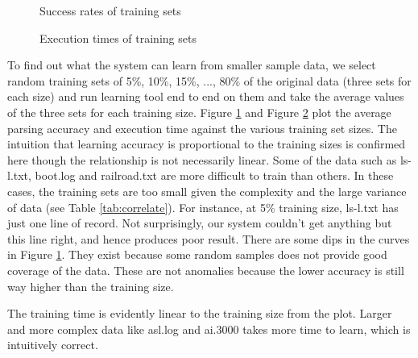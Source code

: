 \begin{figure}
\caption{Success rates of training sets} \label{fig:trainsucc}
\end{figure}

\begin{figure}
\caption{Execution times of training sets} \label{fig:traintime}
\end{figure}

To find out what the system can learn from smaller sample data,
we select random training sets of 5\%, 10\%, 15\%, ..., 80\% of 
the original data (three sets for each size) and run learning tool end to end on 
them and take the average values of the three sets for each training size. 
Figure \ref{fig:trainsucc} and Figure \ref{fig:traintime} plot the average 
parsing accuracy and execution time against the various training set sizes.
The intuition that learning accuracy is proportional to the training sizes is
confirmed here though the relationship is not necessarily linear. Some of the
data such as ls-l.txt, boot.log and railroad.txt are more difficult to train
than others. In these cases, the training sets are too small 
given the complexity and the large variance of data (see Table \ref{tab:correlate}).
For instance, at 5\% training size, ls-l.txt has just one line of record. 
Not surprisingly, our system couldn't get anything but this line right, and
hence produces poor result. There are some dips in the curves in Figure \ref{fig:trainsucc}.
They exist because some random samples does not provide good coverage of the data.
These are not anomalies because the lower accuracy is still way higher than the 
training size. 

The training time is evidently linear to the training size from the plot. Larger
and more complex data like asl.log and ai.3000 takes more time to learn, which
is intuitively correct.

